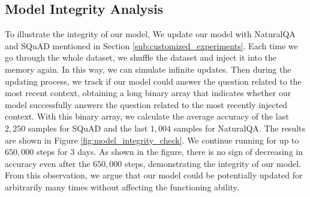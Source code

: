 \documentclass{article}
\theoremstyle{plain}
\theoremstyle{definition}
\theoremstyle{remark}
\begin{document}
\subsection{Model Integrity Analysis}
\label{sub:model_integrity_analysis}
To illustrate the integrity of our model, 
We update our model with NaturalQA and SQuAD mentioned in Section \ref{sub:customized_experiments}. 
Each time we go through the whole dataset, we shuffle the dataset and inject it into the memory again. In this way, we can simulate infinite updates. Then during the updating process, we track if our model could answer the question related to the most recent context, obtaining a long binary array that indicates whether our model successfully answers the question related to the most recently injected context. With this binary array, we calculate the average accuracy of the last $2,250$ samples for SQuAD and the last $1,004$ samples for NaturalQA. The results are shown in Figure \ref{fig:model_integrity_check}. We continue running for up to $650,000$ steps for $3$ days. As shown in the figure, there is no sign of decreasing in accuracy even after the $650,000$ steps, demonstrating the integrity of our model. From this observation, we argue that our model could be potentially updated for arbitrarily many times without affecting the functioning ability. 


\vspace{-5pt}
\end{document}
